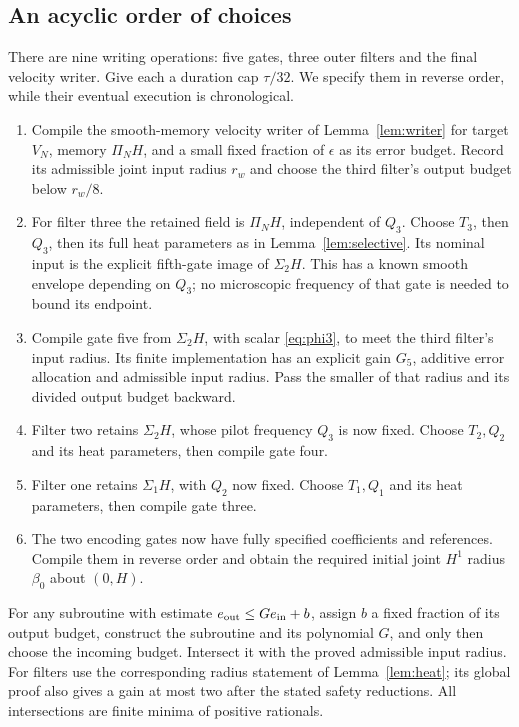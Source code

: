 \documentclass[11pt,a4paper]{amsart}
\theoremstyle{definition}
\theoremstyle{remark}
\numberwithin{equation}{section}
\begin{document}
\subsection{An acyclic order of choices}
There are nine writing operations: five gates, three outer filters and the
final velocity writer. Give each a duration cap $\tau/32$. We specify them
in reverse order, while their eventual execution is chronological.
\begin{enumerate}
\item Compile the smooth-memory velocity writer of
Lemma~\ref{lem:writer} for target $V_N$, memory $\Pi_NH$, and a small fixed
fraction of $\epsilon$ as its error budget. Record its admissible joint
input radius $r_w$ and choose the third filter's output budget below $r_w/8$.
\item For filter three the retained field is $\Pi_NH$, independent of
$Q_3$. Choose $T_3$, then $Q_3$, then its full heat parameters as in
Lemma~\ref{lem:selective}. Its nominal input is the explicit fifth-gate
image of $\Sigma_2H$. This has a known smooth envelope depending on $Q_3$;
no microscopic frequency of that gate is needed to bound its endpoint.
\item Compile gate five from $\Sigma_2H$, with scalar \eqref{eq:phi3}, to
meet the third filter's input radius. Its finite implementation has an
explicit gain $G_5$, additive error allocation and admissible input radius.
Pass the smaller of that radius and its divided output budget backward.
\item Filter two retains $\Sigma_2H$, whose pilot frequency $Q_3$ is now
fixed. Choose $T_2,Q_2$ and its heat parameters, then compile gate four.
\item Filter one retains $\Sigma_1H$, with $Q_2$ now fixed. Choose
$T_1,Q_1$ and its heat parameters, then compile gate three.
\item The two encoding gates now have fully specified coefficients and
references. Compile them in reverse order and obtain the required initial
joint $H^1$ radius $\beta_0$ about $(0,H)$.
\end{enumerate}
For any subroutine with estimate $e_{\rm out}\le G e_{\rm in}+b$, assign
$b$ a fixed fraction of its output budget, construct the subroutine and its
polynomial $G$, and only then choose the incoming budget. Intersect it with
the proved admissible input radius. For filters use the corresponding
radius statement of Lemma~\ref{lem:heat}; its global proof also gives a
gain at most two after the stated safety reductions. All intersections
are finite minima of positive rationals.
\end{document}
